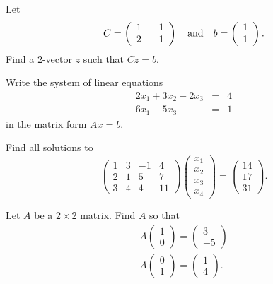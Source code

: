 \begin{exercise} \label{c4.1.3}
Let
\[
C = \left(\begin{array}{rr} 1 & 1\\ 2 &-1\end{array}\right) \quad\mbox{and}\quad b = \left(\begin{array}{r} 1 \\ 1\end{array}\right).
\]
Find a $2$-vector $z$ such that $Cz=b$.
\end{exercise}

\begin{exercise} \label{c4.1.4}
Write the system of linear equations
\begin{eqnarray*}
2x_1 + 3x_2 - 2x_3 & = & 4\\
6x_1 -5x_3 & = & 1
\end{eqnarray*}
in the matrix form $Ax=b$.
\end{exercise}


\begin{exercise} \label{c4.1.6}
Find all solutions to
\[
\left(\begin{array}{rrrr} 1 & 3 & -1 & 4 \\ 2 & 1 & 5 & 7 \\
3 & 4 & 4 & 11 \end{array} \right)
\left(\begin{array}{c} x_1 \\ x_2 \\ x_3 \\ x_4\end{array}\right) =
\left(\begin{array}{c} 14 \\ 17 \\31 \end{array}\right).
\]
\end{exercise}

\begin{exercise} \label{c4.1.7}
Let $A$ be a $2\times 2$ matrix.  Find $A$ so that
\begin{eqnarray*}
A\left(\begin{array}{c} 1 \\ 0 \end{array}\right) =
\left(\begin{array}{r} 3 \\ -5 \end{array}\right) \\
A\left(\begin{array}{c} 0 \\ 1 \end{array}\right) =
\left(\begin{array}{r} 1 \\ 4 \end{array}\right).
\end{eqnarray*}
\end{exercise}

